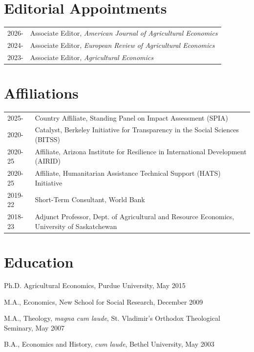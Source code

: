 \documentclass[letterpaper]{article}
\renewenvironment{itemize}{
  \begin{list}
  	{}{
    \setlength{\leftmargin}{1.5em}
    \setlength{\itemsep}{-.5em}
  }
}{
  \end{list}
}
\begin{document}
\section*{\sc Editorial Appointments}
\begin{tabular}{ll}
2026-		& Associate Editor, \emph{American Journal of Agricultural Economics}	 \\
2024-		& Associate Editor, \emph{European Review of Agricultural Economics}	 \\
2023-		& Associate Editor, \emph{Agricultural Economics}	 \\
\end{tabular}


\section*{\sc Affiliations}
\begin{tabular}{ll}
2025- 		& Country Affiliate, Standing Panel on Impact Assessment (SPIA)	 \\
2020- 		& Catalyst, Berkeley Initiative for Transparency in the Social Sciences (BITSS)	 \\
2020-25     & Affiliate, Arizona Institute for Resilience in International Development (AIRID) \\
2020-25		& Affiliate, Humanitarian Assistance Technical Support (HATS) Initiative \\
2019-22		& Short-Term Consultant, World Bank \\
2018-23		& Adjunct Professor, Dept. of Agricultural and Resource Economics, University of Saskatchewan \\
\end{tabular}

\section*{\sc Education}
\begin{itemize}
	\item Ph.D. Agricultural Economics, Purdue University, May 2015
	\item M.A., Economics, New School for Social Research, December 2009
	\item M.A., Theology, \emph{magna cum laude}, St. Vladimir's Orthodox Theological Seminary, May 2007
	\item B.A., Economics and History, \emph{cum laude}, Bethel University, May 2003  
\end{itemize}
\end{document}

